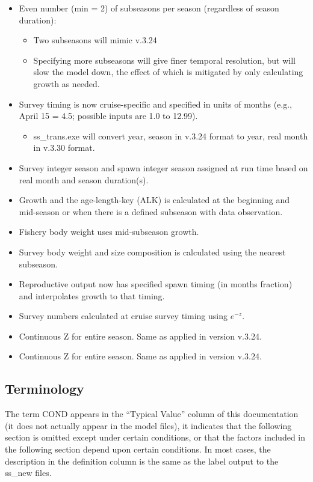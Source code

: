 	\begin{itemize}
		\item Even number (min = 2) of subseasons per season (regardless of season duration):
			\begin{itemize}
				\item Two subseasons will mimic v.3.24
				\item Specifying more subseasons will give finer temporal resolution, but will slow the model down, the effect of which is mitigated by only calculating growth as needed.
			\end{itemize}
		\item Survey timing is now cruise-specific and specified in units of months (e.g., April 15 = 4.5; possible inputs are 1.0 to 12.99).
			\begin{itemize}
				\item ss\_trans.exe will convert year, season in v.3.24 format to year, real month in v.3.30 format.
			\end{itemize}
		\item Survey integer season and spawn integer season assigned at run time based on real month and season duration(s).
		\item Growth and the age-length-key (ALK) is calculated at the beginning and mid-season or when there is a defined subseason with data observation.
		\item Fishery body weight uses mid-subseason growth.
		\item Survey body weight and size composition is calculated using the nearest subseason.
		\item Reproductive output now has specified spawn timing (in months fraction) and interpolates growth to that timing.
		\item Survey numbers calculated at cruise survey timing using $e^{-z}$.
		\item Continuous Z for entire season. Same as applied in version v.3.24.
		\item Continuous Z for entire season. Same as applied in version v.3.24.
	\end{itemize}

\subsection{Terminology}
The term COND appears in the ``Typical Value'' column of this documentation (it does not actually appear in the model files), it indicates that the following section is omitted except under certain conditions, or that the factors included in the following section depend upon certain conditions. In most cases, the description in the definition column is the same as the label output to the ss\_new files.

